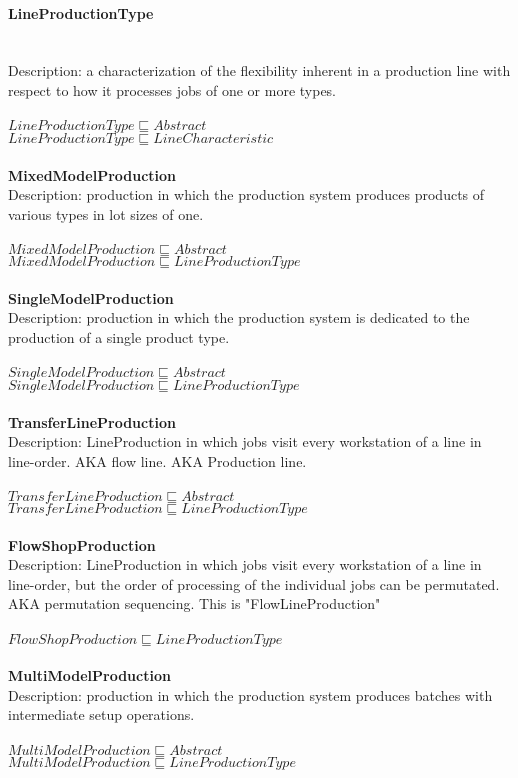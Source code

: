 \paragraph{LineProductionType}\\
Description: a characterization of the flexibility inherent in a production line with respect to how it processes jobs of one or more types.\\
\\$ LineProductionType \sqsubseteq Abstract$
\\$ LineProductionType \sqsubseteq LineCharacteristic$
\\\\   \textbf{MixedModelProduction}\\Description: production in which the production system produces products of various types in lot sizes of one. \cite{Liao2014}\\
\\$ MixedModelProduction \sqsubseteq Abstract$
\\$ MixedModelProduction \sqsubseteq LineProductionType$
\\\\   \textbf{SingleModelProduction}\\Description: production in which the production system is dedicated to the production of a single product type. \cite{Liao2014}\\
\\$ SingleModelProduction \sqsubseteq Abstract$
\\$ SingleModelProduction \sqsubseteq LineProductionType$
\\\\   \textbf{TransferLineProduction}\\Description: LineProduction in which jobs visit every workstation of a line in line-order. AKA flow line. AKA Production line. \cite{Dallery1992}\\
\\$ TransferLineProduction \sqsubseteq Abstract$
\\$ TransferLineProduction \sqsubseteq LineProductionType$
\\\\   \textbf{FlowShopProduction}\\Description: LineProduction in which jobs visit every workstation of a line in line-order, but the order of processing of the individual jobs can be permutated. AKA permutation sequencing. This is \cite{Bautista2015} "FlowLineProduction"\\
\\$ FlowShopProduction \sqsubseteq LineProductionType$
\\\\   \textbf{MultiModelProduction}\\Description: production in which the production system produces batches with intermediate setup operations. \cite{Liao2014}\\
\\$ MultiModelProduction \sqsubseteq Abstract$
\\$ MultiModelProduction \sqsubseteq LineProductionType$

